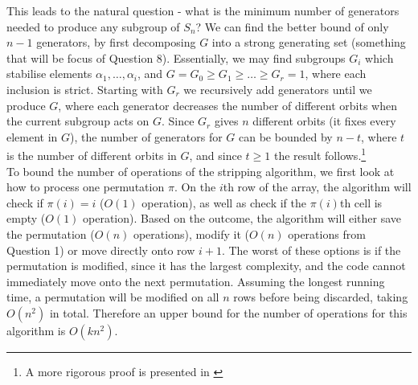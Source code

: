 \documentclass[10pt,a4paper,notitlepage]{article}
\begin{document}
This leads to the natural question - what is the minimum number of generators needed to produce any subgroup of $S_{n}$? We can find the better bound of only $n-1$ generators, by first decomposing $G$ into a strong generating set (something that will be focus of Question 8). Essentially, we may find subgroups $G_{i}$ which stabilise elements $\alpha_{1},\hdots,\alpha_{i}$, and $G=G_{0}\geq G_{1}\geq\hdots \geq G_{r}=1$, where each inclusion is strict. Starting with $G_{r}$ we recursively add generators until we produce $G$, where each generator decreases the number of different orbits when the current subgroup acts on $G$. Since $G_{r}$ gives $n$ different orbits (it fixes every element in $G$), the number of generators for $G$ can be bounded by $n-t$, where $t$ is the number of different orbits in $G$, and since $t\geq 1$ the result follows.\footnote{A more rigorous proof is presented in \cite{JERRUM198660}}\\

To bound the number of operations of the stripping algorithm, we first look at how to process one permutation $\pi$. On the $i$th row of the array,  the algorithm will check if $\pi(i)=i$ ($O(1)$ operation), as well as check if the $\pi(i)$th cell is empty ($O(1)$ operation). Based on the outcome, the algorithm will either save the permutation ($O(n)$ operations), modify it ($O(n)$ operations from Question 1) or move directly onto row $i+1$. The worst of these options is if the permutation is modified, since it has the largest complexity, and the code cannot immediately move onto the next permutation. Assuming the longest running time, a permutation will be modified on all $n$ rows before being discarded,  taking $O(n^{2})$ in total. Therefore an upper bound for the number of operations for this algorithm is $O(kn^{2})$.
\end{document}
